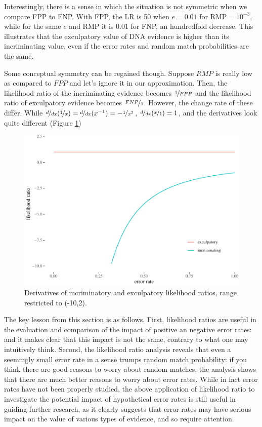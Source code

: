 \documentclass[
  10pt,
  dvipsnames,enabledeprecatedfontcommands]{scrartcl}
\begin{document}
Interestingly, there is a sense in which the situation is not symmetric
when we compare FPP to FNP. With FPP, the LR is 50 when \(e=0.01\) for
RMP\(=10^{-3}\), while for the same \(e\) and RMP it is \(0.01\) for
FNP, an hundredfold decrease. This illustrates that the exculpatory
value of DNA evidence is higher than its incriminating value, even if
the error rates and random match probabilities are the same.

Some conceptual symmetry can be regained though. Suppose \(RMP\) is
really low as compared to \(FPP\) and let's ignore it in our
approximation. Then, the likelihood ratio of the incriminating evidence
becomes \(\nicefrac{1}{FPP}\) and the likelihood ratio of exculpatory
evidence becomes \(\nicefrac{FNP}{1}\). However, the change rate of
these differ. While
\(\nicefrac{d}{dx}(\nicefrac{1}{x}) = \nicefrac{d}{dx} (x^{-1}) = - \nicefrac{1}{x^2}\),
\(\nicefrac{d}{dx}(\nicefrac{x}{1})=1\), and the derivatives look quite
different (Figure \ref{fig:der})

\begin{figure}[h]

\begin{center}\includegraphics[width=1\linewidth]{lr-chapter4_files/figure-latex/fp-derivatives-1} \end{center}
\caption{Derivatives of incriminatory and exculpatory likelihood ratios, range restricted to (-10,2).}
\label{fig:der}
\end{figure}

The key lesson from this section is as follows. First, likelihood ratios
are useful in the evaluation and comparison of the impact of positive an
negative error rates: and it makes clear that this impact is not the
same, contrary to what one may intuitively think. Second, the likelihood
ratio analysis reveals that even a seemingly small error rate in a sense
trumps random match probability: if you think there are good reasons to
worry about random matches, the analysis shows that there are much
better reasons to worry about error rates. While in fact error rates
have not been properly studied, the above application of likelihood
ratio to investigate the potential impact of hypothetical error rates is
still useful in guiding further research, as it clearly suggests that
error rates may have serious impact on the value of various types of
evidence, and so require attention.
\end{document}

